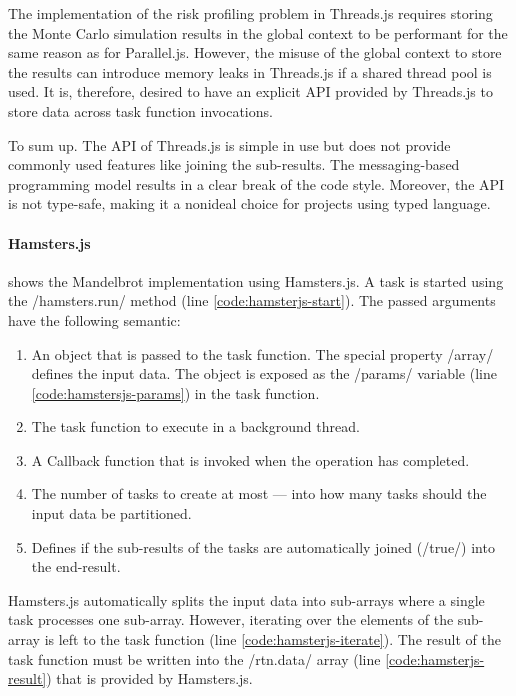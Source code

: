 The implementation of the risk profiling problem in Threads.js requires storing the Monte Carlo simulation results in the global context to be performant for the same reason as for Parallel.js. However, the misuse of the global context to store the results can introduce memory leaks in Threads.js if a shared thread pool is used. It is, therefore, desired to have an explicit API provided by Threads.js to store data across task function invocations.

To sum up. The API of Threads.js is simple in use but does not provide commonly used features like joining the sub-results. The messaging-based programming model results in a clear break of the code style. Moreover, the API is not type-safe, making it a nonideal choice for projects using typed language.

\paragraph{Hamsters.js}
 shows the Mandelbrot implementation using Hamsters.js. A task is started using the \javascriptinline/hamsters.run/ method (line \ref{code:hamsterjs-start}). The passed arguments have the following semantic:

\begin{enumerate}
	\item An object that is passed to the task function. The special property \javascriptinline/array/ defines the input data. The object is exposed as the \javascriptinline/params/ variable (line \ref{code:hamstersjs-params}) in the task function.
	\item The task function to execute in a background thread.
	\item A Callback function that is invoked when the operation has completed.
	\item The number of tasks to create at most --- into how many tasks should the input data be partitioned. 
	\item Defines if the sub-results of the tasks are automatically joined (\javascriptinline/true/) into the end-result.
\end{enumerate}

Hamsters.js automatically splits the input data into sub-arrays where a single task processes one sub-array. However, iterating over the elements of the sub-array is left to the task function (line \ref{code:hamsterjs-iterate}). The result of the task function must be written into the \javascriptinline/rtn.data/ array (line \ref{code:hamsterjs-result}) that is provided by Hamsters.js. 

